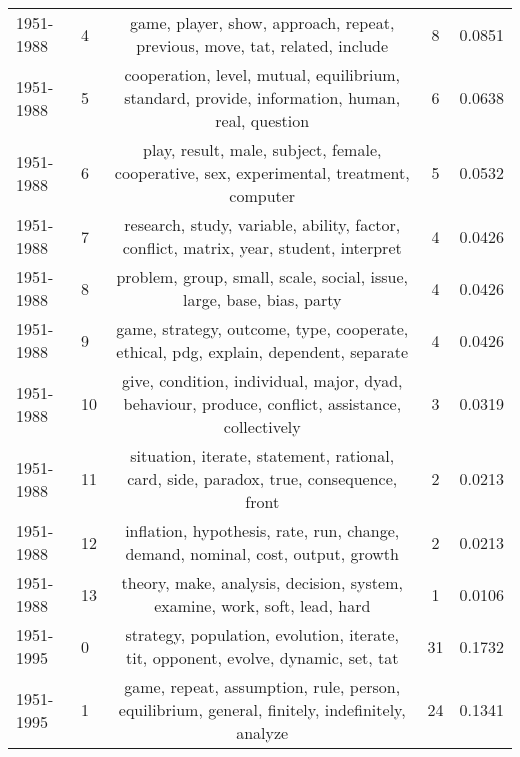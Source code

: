 \begin{tabular}{llccc}
 1951-1988 &               4 &                                   game, player, show, approach, repeat, previous, move, tat, related, include &                8 &                  0.0851 \\
 1951-1988 &               5 &                cooperation, level, mutual, equilibrium, standard, provide, information, human, real, question &                6 &                  0.0638 \\
 1951-1988 &               6 &                      play, result, male, subject, female, cooperative, sex, experimental, treatment, computer &                5 &                  0.0532 \\
 1951-1988 &               7 &                        research, study, variable, ability, factor, conflict, matrix, year, student, interpret &                4 &                  0.0426 \\
 1951-1988 &               8 &                                         problem, group, small, scale, social, issue, large, base, bias, party &                4 &                  0.0426 \\
 1951-1988 &               9 &                          game, strategy, outcome, type, cooperate, ethical, pdg, explain, dependent, separate &                4 &                  0.0426 \\
 1951-1988 &              10 &              give, condition, individual, major, dyad, behaviour, produce, conflict, assistance, collectively &                3 &                  0.0319 \\
 1951-1988 &              11 &                        situation, iterate, statement, rational, card, side, paradox, true, consequence, front &                2 &                  0.0213 \\
 1951-1988 &              12 &                               inflation, hypothesis, rate, run, change, demand, nominal, cost, output, growth &                2 &                  0.0213 \\
 1951-1988 &              13 &                                     theory, make, analysis, decision, system, examine, work, soft, lead, hard &                1 &                  0.0106 \\
 \midrule
 1951-1995 &               0 &                            strategy, population, evolution, iterate, tit, opponent, evolve, dynamic, set, tat &               31 &                  0.1732 \\
 1951-1995 &               1 &                 game, repeat, assumption, rule, person, equilibrium, general, finitely, indefinitely, analyze &               24 &                  0.1341 \\

\end{tabular}
